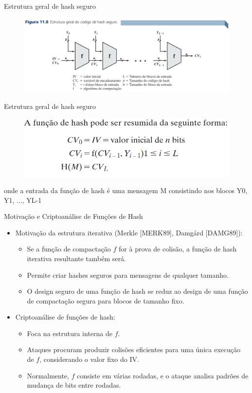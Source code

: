 \begin{frame}{Estrutura geral de hash seguro}
       \begin{figure}
        \centering
        \includegraphics[width=0.9\linewidth]{Figuras/estrutura-gera-hash-seguro.png}
    \end{figure}
\end{frame}

\begin{frame}{Estrutura geral de hash seguro}
       \begin{figure}
        \centering
        \includegraphics[width=0.9\linewidth]{Figuras/pode-ser-resumida-seg-forma.png}
    \end{figure}
onde a entrada da função de hash é uma mensagem M consistindo nos blocos Y0, Y1, ..., YL-1
\end{frame}

\begin{frame}{Motivação e Criptoanálise de Funções de Hash}
    \begin{itemize}
        \item Motivação da estrutura iterativa (Merkle [MERK89], Damgård [DAMG89]):
        \begin{itemize}
            \item Se a função de compactação $f$ for à prova de colisão, a função de hash iterativa resultante também será.
            \item Permite criar hashes seguros para mensagens de qualquer tamanho.
            \item O design seguro de uma função de hash se reduz ao design de uma função de compactação segura para blocos de tamanho fixo.
        \end{itemize}
        \item Criptoanálise de funções de hash:
        \begin{itemize}
            \item Foca na estrutura interna de $f$.
            \item Ataques procuram produzir colisões eficientes para uma única execução de $f$, considerando o valor fixo do IV.
            \item Normalmente, $f$ consiste em várias rodadas, e o ataque analisa padrões de mudança de bits entre rodadas.
        \end{itemize}
    \end{itemize}
\end{frame}

